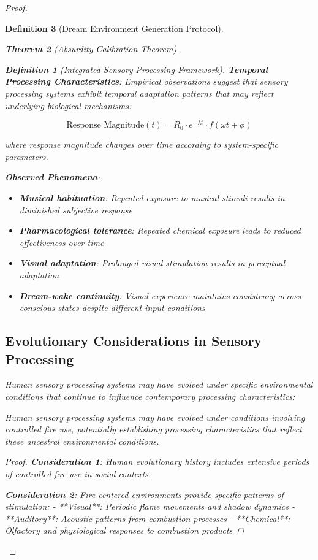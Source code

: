 \documentclass[12pt,a4paper]{article}
\newtheorem{theorem}{Theorem}[section]
\newtheorem{definition}[theorem]{Definition}
\begin{document}
\begin{proof}
\begin{definition}[Dream Environment Generation Protocol]
\begin{theorem}[Absurdity Calibration Theorem]
\begin{observation}
\begin{definition}[Integrated Sensory Processing Framework]
\textbf{Temporal Processing Characteristics}:
Empirical observations suggest that sensory processing systems exhibit temporal adaptation patterns that may reflect underlying biological mechanisms:

$$\text{Response Magnitude}(t) = R_0 \cdot e^{-\lambda t} \cdot f(\omega t + \phi)$$

where response magnitude changes over time according to system-specific parameters.

\textbf{Observed Phenomena}:
\begin{itemize}
\item \textbf{Musical habituation}: Repeated exposure to musical stimuli results in diminished subjective response
\item \textbf{Pharmacological tolerance}: Repeated chemical exposure leads to reduced effectiveness over time
\item \textbf{Visual adaptation}: Prolonged visual stimulation results in perceptual adaptation
\item \textbf{Dream-wake continuity}: Visual experience maintains consistency across conscious states despite different input conditions
\end{itemize}

\subsection{Evolutionary Considerations in Sensory Processing}

Human sensory processing systems may have evolved under specific environmental conditions that continue to influence contemporary processing characteristics:

\begin{hypothesis}
Human sensory processing systems may have evolved under conditions involving controlled fire use, potentially establishing processing characteristics that reflect these ancestral environmental conditions.
\end{hypothesis}

\begin{proof}
\textbf{Consideration 1}: Human evolutionary history includes extensive periods of controlled fire use in social contexts.

\textbf{Consideration 2}: Fire-centered environments provide specific patterns of stimulation:
- **Visual**: Periodic flame movements and shadow dynamics
- **Auditory**: Acoustic patterns from combustion processes
- **Chemical**: Olfactory and physiological responses to combustion products


\end{proof}
\end{definition}
\end{observation}
\end{theorem}
\end{definition}
\end{proof}
\end{document}
